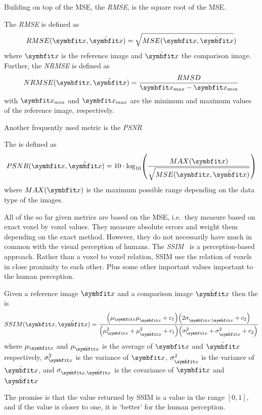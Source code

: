 Building on top of the \gls{MSE}, the \textit{\gls{RMSE}}, is the square root of the
\gls{MSE}.
\begin{definition}
	The \textit{\gls{RMSE}} is defined as
	\[ RMSE(\mvec{x}, \hat{\mvec{x}}) = \sqrt{MSE(\mvec{x}, \hat{\mvec{x}}}) \]
	where \(\mvec{x}\) is the reference image and \(\hat{\mvec{x}}\) the comparison image.
	Further, the \textit{\gls{NRMSE}} is defined as
	\[ NRMSE(\mvec{x}, \hat{\mvec{x}}) = \frac{RMSD}{\mvec{x}_{max} - \mvec{x}_{min}} \]
	with \(\mvec{x}_{min}\) and \(\mvec{x}_{max}\) are the minimum and maximum values of the
	reference image, respectively.
\end{definition}
Another frequently used metric is the \textit{\gls{PSNR}}
\begin{definition}
	The \textit{} is defined as
	\[ PSNR(\mvec{x}, \hat{\mvec{x}}) = 10 \cdot \log_{10}\left( \frac{MAX(\mvec{x})}{\sqrt{MSE(\mvec{x}, \hat{\mvec{x}})}} \right) \]
	where \(MAX(\mvec{x})\) is the maximum possible range depending on the data type of the
	images.
\end{definition}

All of the so far given metrics are based on the \gls{MSE}, i.e.\ they measure based on exact voxel
by voxel values. They measure absolute errors and weight them depending on the exact method.
However, they do not necessarily have much in common with the visual perception of humans. The
\textit{\gls{SSIM}}~\cite{wang_image_2004,avanaki_exact_2009} is a perception-based approach. Rather
than a voxel to voxel relation, \gls{SSIM} use the relation of voxels in close proximity to each
other. Plus some other important values important to the human perception.
\begin{definition}
	Given a reference image \(\mvec{x}\) and a comparison image \(\hat{\mvec{x}}\) then the
	\textit{} is
	\[ SSIM(\mvec{x}, \hat{\mvec{x}}) =
		\frac{
			\left( \mu_{\mvec{x}} \mu_{\hat{\mvec{x}}} + c_1 \right)
			\left( 2 \sigma_{\mvec{x}, \hat{\mvec{x}}} + c_2 \right)
		}{
			\left( \mu_{\mvec{x}}^2 + \mu_{\hat{\mvec{x}}}^2 + c_1 \right)
			\left( \sigma_{\mvec{x}}^2 + \sigma_{\hat{\mvec{x}}}^2 + c_2 \right)
		}
	\]
	where \(\mu_{\mvec{x}}\) and \(\mu_{\hat{\mvec{x}}}\) is the average of \(\mvec{x}\)
	and \(\hat{\mvec{x}}\) respectively, \(\sigma_{\mvec{x}}^2\) is the variance of \(\mvec{x}\),
	\(\sigma_{\hat{\mvec{x}}}^2\) is the variance of \(\hat{\mvec{x}}\), and \(\sigma_{\mvec{x},
		\hat{\mvec{x}}}\) is the covariance of \(\mvec{x}\) and \(\hat{\mvec{x}}\)
\end{definition}
The promise is that the value returned by \gls{SSIM} is a value in the range \([0, 1]\), and if the
value is closer to one, it is `better' for the human perception.

